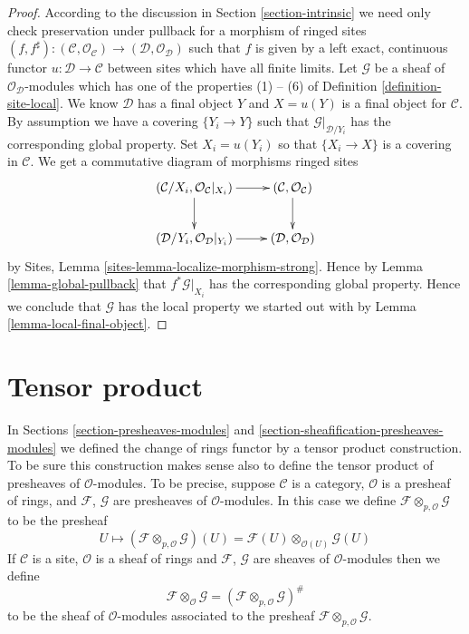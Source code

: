 \begin{proof}
According to the discussion in Section \ref{section-intrinsic}
we need only check preservation under pullback for a morphism of ringed sites
$(f, f^\sharp) :
(\mathcal{C}, \mathcal{O}_{\mathcal{C}})
\to
(\mathcal{D}, \mathcal{O}_{\mathcal{D}})$
such that $f$ is given by a left exact, continuous functor
$u : \mathcal{D} \to \mathcal{C}$ between sites which have 
all finite limits.
Let $\mathcal{G}$ be a sheaf of $\mathcal{O}_{\mathcal{D}}$-modules
which has one of the properties (1) -- (6) of
Definition \ref{definition-site-local}.
We know $\mathcal{D}$ has a final object $Y$ and $X = u(Y)$
is a final object for $\mathcal{C}$. By assumption we have
a covering $\{Y_i \to Y\}$ such that $\mathcal{G}|_{\mathcal{D}/Y_i}$
has the corresponding global property. Set $X_i = u(Y_i)$ so
that $\{X_i \to X\}$ is a covering in $\mathcal{C}$.
We get a commutative diagram of morphisms ringed sites
$$
\xymatrix{
(\mathcal{C}/X_i, \mathcal{O}_{\mathcal{C}}|_{X_i}) \ar[r] \ar[d] &
(\mathcal{C}, \mathcal{O}_{\mathcal{C}}) \ar[d] \\
(\mathcal{D}/Y_i, \mathcal{O}_{\mathcal{D}}|_{Y_i}) \ar[r] &
(\mathcal{D}, \mathcal{O}_{\mathcal{D}})
}
$$
by Sites, Lemma \ref{sites-lemma-localize-morphism-strong}.
Hence by Lemma \ref{lemma-global-pullback}
that $f^*\mathcal{G}|_{X_i}$ has the corresponding global
property. Hence we conclude that $\mathcal{G}$ has the local
property we started out with by Lemma \ref{lemma-local-final-object}.
\end{proof}







\section{Tensor product}
\label{section-tensor-product}

\noindent
In Sections \ref{section-presheaves-modules} and
\ref{section-sheafification-presheaves-modules}
we defined the change of rings functor by a tensor
product construction. To be sure this construction makes sense also
to define the tensor product of presheaves of $\mathcal{O}$-modules.
To be precise, suppose $\mathcal{C}$ is a category,
$\mathcal{O}$ is a presheaf of rings, and $\mathcal{F}$, $\mathcal{G}$
are presheaves of $\mathcal{O}$-modules. In this case we define
$\mathcal{F} \otimes_{p, \mathcal{O}} \mathcal{G}$ to be the presheaf
$$
U
\longmapsto
(\mathcal{F} \otimes_{p, \mathcal{O}} \mathcal{G})(U)
=
\mathcal{F}(U) \otimes_{\mathcal{O}(U)} \mathcal{G}(U)
$$
If $\mathcal{C}$ is a site, $\mathcal{O}$ is a sheaf of rings and
$\mathcal{F}$, $\mathcal{G}$ are sheaves of $\mathcal{O}$-modules
then we define
$$
\mathcal{F} \otimes_{\mathcal{O}} \mathcal{G}
=
(\mathcal{F} \otimes_{p, \mathcal{O}} \mathcal{G})^\#
$$
to be the sheaf of $\mathcal{O}$-modules associated to the presheaf
$\mathcal{F} \otimes_{p, \mathcal{O}} \mathcal{G}$.

